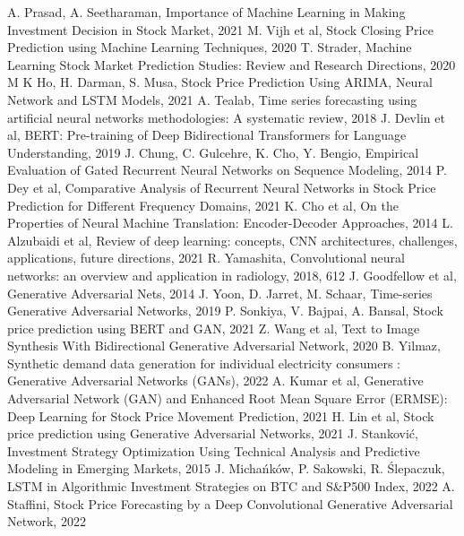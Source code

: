\documentclass[review]{elsarticle} %
\begin{document}
\begin{thebibliography}{9}
A. Prasad, A. Seetharaman, Importance of Machine Learning in Making Investment Decision in Stock Market, 2021
M. Vijh et al, Stock Closing Price Prediction using Machine Learning Techniques, 2020
T. Strader, Machine Learning Stock Market Prediction Studies: Review and Research Directions, 2020
M K Ho, H. Darman, S. Musa,  Stock Price Prediction Using ARIMA, Neural Network and LSTM Models, 2021
A. Tealab, Time series forecasting using artificial neural networks methodologies: A systematic review, 2018
J. Devlin et al, BERT: Pre-training of Deep Bidirectional Transformers for Language Understanding, 2019
J. Chung, C. Gulcehre, K. Cho, Y. Bengio, Empirical Evaluation of Gated Recurrent Neural Networks on Sequence Modeling, 2014
P. Dey et al, Comparative Analysis of Recurrent Neural Networks in Stock Price Prediction for Different Frequency Domains, 2021 
K. Cho et al, On the Properties of Neural Machine Translation: Encoder-Decoder Approaches, 2014
L. Alzubaidi et al, Review of deep learning: concepts, CNN architectures, challenges, applications, future directions, 2021
R. Yamashita, Convolutional neural networks: an overview and application in radiology, 2018, 612
J. Goodfellow et al, Generative Adversarial Nets, 2014
J. Yoon, D. Jarret, M. Schaar, Time-series Generative Adversarial Networks, 2019
P. Sonkiya, V. Bajpai, A. Bansal, Stock price prediction using BERT and GAN, 2021
Z. Wang et al, Text to Image Synthesis With Bidirectional Generative Adversarial Network, 2020
B. Yilmaz, Synthetic demand data generation for individual electricity consumers : Generative Adversarial Networks (GANs), 2022
A. Kumar et al, Generative Adversarial Network (GAN) and Enhanced Root Mean Square Error (ERMSE): Deep Learning for Stock Price Movement Prediction, 2021
H. Lin et al, Stock price prediction using Generative Adversarial Networks, 2021 
J. Stanković, Investment Strategy Optimization Using Technical Analysis and Predictive Modeling in Emerging Markets, 2015
J. Michańków, P. Sakowski, R. Ślepaczuk, LSTM in Algorithmic Investment Strategies on BTC and S\&P500 Index, 2022
A. Staffini, Stock Price Forecasting by a Deep Convolutional Generative Adversarial Network, 2022

\end{thebibliography}
\end{document}
